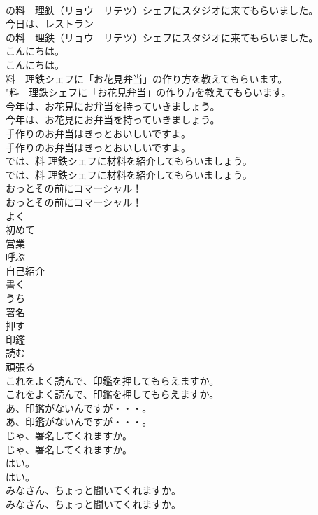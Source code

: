 \documentclass[8pt]{extreport}
\begin{document}
\begin{CJK}{UTF8}{min}
\\	の料　理鉄（リョウ　リテツ）シェフにスタジオに来てもらいました。	
\\	今日は、レストラン 
\\	の料　理鉄（リョウ　リテツ）シェフにスタジオに来てもらいました。 
\\	こんにちは。	
\\	こんにちは。 
\\	料　理鉄シェフに「お花見弁当」の作り方を教えてもらいます。	
\\	"料　理鉄シェフに「お花見弁当」の作り方を教えてもらいます。 
\\	今年は、お花見にお弁当を持っていきましょう。	
\\	今年は、お花見にお弁当を持っていきましょう。 
\\	手作りのお弁当はきっとおいしいですよ。	
\\	手作りのお弁当はきっとおいしいですよ。 
\\	では、料 理鉄シェフに材料を紹介してもらいましょう。	
\\	では、料 理鉄シェフに材料を紹介してもらいましょう。 
\\	おっとその前にコマーシャル！	
\\	おっとその前にコマーシャル！ 
\\	よく
\\	初めて
\\	営業
\\	呼ぶ
\\	自己紹介
\\	書く
\\	うち
\\	署名
\\	押す
\\	印鑑
\\	読む
\\	頑張る
\\	これをよく読んで、印鑑を押してもらえますか。	
\\	これをよく読んで、印鑑を押してもらえますか。 
\\	あ、印鑑がないんですが・・・。	
\\	あ、印鑑がないんですが・・・。 
\\	じゃ、署名してくれますか。	
\\	じゃ、署名してくれますか。 
\\	はい。	
\\	はい。 
\\	みなさん、ちょっと聞いてくれますか。	
\\	みなさん、ちょっと聞いてくれますか。 

\end{CJK}
\end{document}
